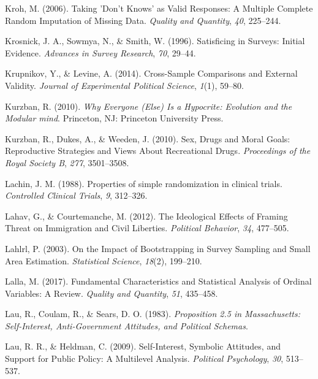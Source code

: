 \documentclass[12pt,econ]{sources/authesis}
\begin{document}
\leavevmode\hypertarget{ref-kroh_2006_taking}{}%
Kroh, M. (2006). Taking 'Don't Knows' as Valid Responses: A Multiple Complete Random Imputation of Missing Data. \emph{Quality and Quantity}, \emph{40}, 225--244.

\leavevmode\hypertarget{ref-krosnick_1996_satisficing}{}%
Krosnick, J. A., Sowmya, N., \& Smith, W. (1996). Satisficing in Surveys: Initial Evidence. \emph{Advances in Survey Research}, \emph{70}, 29--44.

\leavevmode\hypertarget{ref-krupnikov_2014_cross-sample}{}%
Krupnikov, Y., \& Levine, A. (2014). Cross-Sample Comparisons and External Validity. \emph{Journal of Experimental Political Science}, \emph{1}(1), 59--80.

\leavevmode\hypertarget{ref-kurzban_2010_everyone}{}%
Kurzban, R. (2010). \emph{Why Everyone (Else) Is a Hypocrite: Evolution and the Modular mind}. Princeton, NJ: Princeton University Press.

\leavevmode\hypertarget{ref-kurzban_2010_sex}{}%
Kurzban, R., Dukes, A., \& Weeden, J. (2010). Sex, Drugs and Moral Goals: Reproductive Strategies and Views About Recreational Drugs. \emph{Proceedings of the Royal Society B}, \emph{277}, 3501--3508.

\leavevmode\hypertarget{ref-lachin_1988_properties}{}%
Lachin, J. M. (1988). Properties of simple randomization in clinical trials. \emph{Controlled Clinical Trials}, \emph{9}, 312--326.

\leavevmode\hypertarget{ref-lahav_ideological_2012}{}%
Lahav, G., \& Courtemanche, M. (2012). The Ideological Effects of Framing Threat on Immigration and Civil Liberties. \emph{Political Behavior}, \emph{34}, 477--505.

\leavevmode\hypertarget{ref-lahlrl_2003_impact}{}%
Lahlrl, P. (2003). On the Impact of Bootstrapping in Survey Sampling and Small Area Estimation. \emph{Statistical Science}, \emph{18}(2), 199--210.

\leavevmode\hypertarget{ref-lalla_2017_fundamental}{}%
Lalla, M. (2017). Fundamental Characteristics and Statistical Analysis of Ordinal Variables: A Review. \emph{Quality and Quantity}, \emph{51}, 435--458.

\leavevmode\hypertarget{ref-lau_proposition_1983}{}%
Lau, R., Coulam, R., \& Sears, D. O. (1983). \emph{Proposition 2.5 in Massachusetts: Self-Interest, Anti-Government Attitudes, and Political Schemas}.

\leavevmode\hypertarget{ref-lau_2030_self-interest}{}%
Lau, R. R., \& Heldman, C. (2009). Self-Interest, Symbolic Attitudes, and Support for Public Policy: A Multilevel Analysis. \emph{Political Psychology}, \emph{30}, 513--537.
\end{document}
